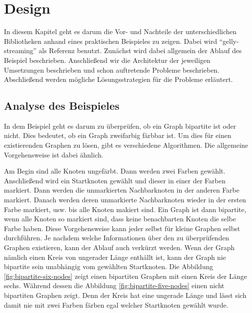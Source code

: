 \chapter{Design}
In diesem Kapitel geht es darum die Vor- und Nachteile der unterschiedlichen
Bibliotheken anhand eines praktischen Beispieles zu zeigen. Dabei wird
\enquote{gelly-streaming} als Referenz benutzt. Zunächst wird dabei allgemein
der Ablauf des Beispiel beschrieben. Anschließend wir die Architektur der
jeweiligen Umsetzungen beschrieben und schon auftretende Probleme beschrieben.
Abschließend werden mögliche Lösungsstrategien für die Probleme erläutert.

\section{Analyse des Beispieles}
In dem Beispiel geht es darum zu überprüfen, ob ein Graph bipartite ist oder
nicht. Dies bedeutet, ob ein Graph zweifarbig färbbar ist. Um dies für einen
existierenden Graphen zu lösen, gibt es verschiedene Algorithmen. Die allgemeine
Vorgehensweise ist dabei ähnlich.

Am Begin sind alle Knoten ungefärbt. Dann werden zwei Farben gewählt.
Anschließend wird ein Startknoten gewählt und dieser in einer der Farben markiert.
Dann werden die unmarkierten Nachbarknoten in der anderen Farbe markiert. Danach
werden deren unmarkierte Nachbarknoten wieder in der ersten Farbe markiert, usw.
bis alle Knoten makiert sind. Ein Graph ist dann bipartite, wenn alle Knoten so
markiert sind, dass keine benachbarten Knoten die selbe Farbe haben. Diese
Vorgehensweise kann jeder selbst für kleine Graphen selbst durchführen. Je nachdem
welche Informationen über den zu überprüfenden Graphen existieren, kann der Ablauf
auch verkürzt werden. Wenn der Graph nämlich einen Kreis von ungerader Länge
enthällt ist, kann der Graph nie bipartite sein unabhängig vom gewählten
Startknoten. Die Abbildung \ref{fig:bipartite-six-nodes} zeigt einen bipartiten
Graphen mit einen Kreis der Länge sechs. Während dessen die Abbildung \ref{fig:bipartite-five-nodes}
einen nicht bipartiten Graphen zeigt. Denn der Kreis hat eine ungerade Länge und
lässt sich damit nie mit zwei Farben färben egal welcher Startknoten gewählt
wurde. 

